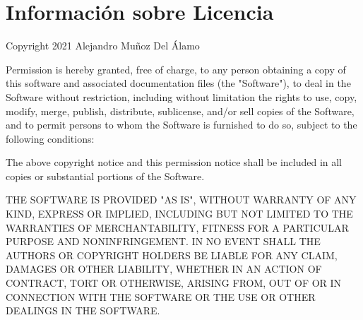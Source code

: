 

\chapter{Información sobre Licencia}
\thispagestyle{chapterpage}

Copyright 2021 Alejandro Muñoz Del Álamo\medskip

Permission is hereby granted, free of charge, to any person obtaining a copy of this software and associated documentation files 
(the "Software"), to deal in the Software without restriction, including without limitation the rights to use, copy, modify, 
merge, publish, distribute, sublicense, and/or sell copies of the Software, and to permit persons to whom the Software is furnished 
to do so, subject to the following conditions: \medskip

The above copyright notice and this permission notice shall be included in all copies or substantial portions of the Software.\medskip

THE SOFTWARE IS PROVIDED "AS IS", WITHOUT WARRANTY OF ANY KIND, EXPRESS OR IMPLIED, INCLUDING BUT NOT LIMITED TO THE WARRANTIES 
OF MERCHANTABILITY, FITNESS FOR A PARTICULAR PURPOSE AND NONINFRINGEMENT. IN NO EVENT SHALL THE AUTHORS OR COPYRIGHT HOLDERS 
BE LIABLE FOR ANY CLAIM, DAMAGES OR OTHER LIABILITY, WHETHER IN AN ACTION OF CONTRACT, TORT OR OTHERWISE, ARISING FROM, 
OUT OF OR IN CONNECTION WITH THE SOFTWARE OR THE USE OR OTHER DEALINGS IN THE SOFTWARE.